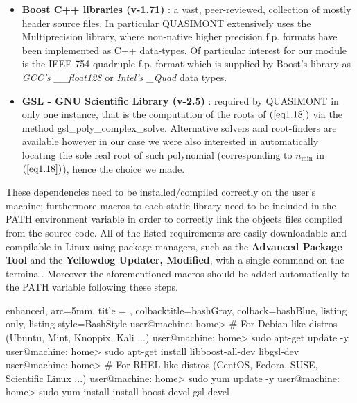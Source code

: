 \documentclass[a4paper, twosided]{book}
\begin{document}
\begin{itemize}
    \item \color{poliDarkBlue} \textbf{Boost C++ libraries (v-1.71)} \color{black}\cite{boost}: a vast, peer-reviewed, collection of mostly header source files. In particular QUASIMONT extensively uses the \colorbox{poliGrayBlue}{Multiprecision} library, where non-native higher precision f.p. formats have been implemented as C++ data-types. Of particular interest for our module is the IEEE 754 quadruple f.p. format which is supplied by Boost's library as {\itshape GCC's \_\_float128} or {\itshape Intel's \_Quad} data types.
    \item \color{poliDarkBlue} \textbf{GSL - GNU Scientific Library (v-2.5)} \color{black}\cite{gsl}: required by QUASIMONT in only one instance, that is the computation of the roots of $(\ref{eq1.18})$ via the method \colorbox{poliGrayBlue}{gsl\_poly\_complex\_solve}. Alternative solvers and root-finders are available however in our case we were also interested in automatically locating the sole real root of such polynomial (corresponding to $n_{\text{min}}$ in $(\ref{eq1.18})$), hence the choice we made.
\end{itemize}

\noindent
These dependencies need to be installed/compiled correctly on the user's machine; furthermore macros to each static library need to be included in the \colorbox{poliGrayBlue}{PATH} environment variable in order to correctly link the objects files compiled from the source code. All of the listed requirements are easily downloadable and compilable in Linux using package managers, such as the \color{poliDarkBlue} \textbf{Advanced Package Tool} \color{black} and the \color{poliDarkBlue} \textbf{Yellowdog Updater, Modified}\color{black}, with a single command on the terminal. Moreover the aforementioned macros should be added automatically to the \colorbox{poliGrayBlue}{PATH} variable following these steps.

\vspace{0.5cm}
\begin{tcblisting}{enhanced,
                   arc=5mm,
                   title = \color{black}{\large \ttfamily Installation of third-party libraries},
                   colbacktitle=bashGray,
                   colback=bashBlue,
                   listing only,
                   listing style=BashStyle}
user@machine: home> # For Debian-like distros (Ubuntu, Mint, Knoppix, Kali ...)
user@machine: home> sudo apt-get update -y
user@machine: home> sudo apt-get install libboost-all-dev libgsl-dev
user@machine: home> # For RHEL-like distros (CentOS, Fedora, SUSE, Scientific Linux ...)
user@machine: home> sudo yum update -y
user@machine: home> sudo yum install install boost-devel gsl-devel
\end{tcblisting}
\vspace{0.5cm}
\end{document}
